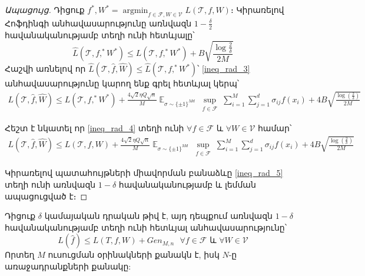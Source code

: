 \documentclass[12pt]{article}
\DeclareMathOperator*{\argmin}{argmin}
\DeclareMathOperator*{\E}{\mathbb{E}}
\begin{document}
\begin{proof}[Ապացույց]
Դիցուք $f^*, W^* = \argmin_{f \in \mathcal{F}, W \in \mathcal{V}}L(\mathcal{T}, f, W)$։ Կիրառելով Հոֆդինգի անհավասարությունը առնվազն $1- \frac{\delta}{2}$ հավանականությամբ տեղի ունի հետևյալը՝
$$\hat{L}(\mathcal{T}, f,^* W^*) \leq L(\mathcal{T}, f,^* W^*) + B\sqrt{\frac{\log\frac{2}{\delta}}{2M}}$$
Հաշվի առնելով որ $\hat{L}(\mathcal{T}, \hat{f}, \hat{W})  \leq \hat{L}(\mathcal{T}, f,^* W^*) $՝ \ref{ineq_rad_3} անհավասարությունը կարող ենք գրել հետևյալ կերպ՝
\begin{align}
\label{ineq_rad_4}
L(\mathcal{T}, \hat{f}, \hat{W}) \leq  L(\mathcal{T}, f,^* W^*) + \frac{4\sqrt{2} \eta Q\sqrt{n}}{M} \E_{\sigma \sim \{\pm1\}^{Md}} \sup_{\substack{ f  \in \mathcal{F}  }}\sum_{i=1}^M \sum_{j=1}^d \sigma_{ij}f(x_i)+    4B\sqrt{\frac{\log \left( \frac{2}{\delta} \right)}{2M}}
\end{align}

\noindent Հեշտ է նկատել որ \ref{ineq_rad_4} տեղի ունի  $\forall f \in \mathcal{ F}$ և $\forall W \in \mathcal{V}$ համար՝
\begin{align}
\label{ineq_rad_5}
L(\mathcal{T}, \hat{f}, \hat{W}) \leq  L(\mathcal{T}, f, W) + \frac{4\sqrt{2} \eta Q\sqrt{n}}{M} \E_{\sigma \sim \{\pm1\}^{Md}} \sup_{\substack{ f  \in \mathcal{F}  }}\sum_{i=1}^M \sum_{j=1}^d \sigma_{ij}f(x_i)+    4B\sqrt{\frac{\log \left( \frac{2}{\delta} \right)}{2M}}
\end{align}

Կիրառելով պատահույթների միավորման բանաձևը \ref{ineq_rad_5} տեղի ունի առնվազն $1-\delta$ հավանականությամբ և լեմման ապացուցված է։

\end{proof}

\begin{theorem}
Դիցուք $\delta$ կամայական դրական թիվ է, այդ դեպքում առնվազն $1-\delta$ հավանականությամբ տեղի ունի հետևյալ անհավասարությունը՝ 
$$L(\hat{f}) \leq L(T, f, W) + Gen_{M, n} \text{  } \forall f \in \mathcal{F} \text{ և } \forall{W} \in \mathcal{V}$$
Որտեղ $M$ ուսուցման օրինակների քանակն է, իսկ $N$-ը առաջադրանքների քանակը:
\end{theorem}
\end{document}
